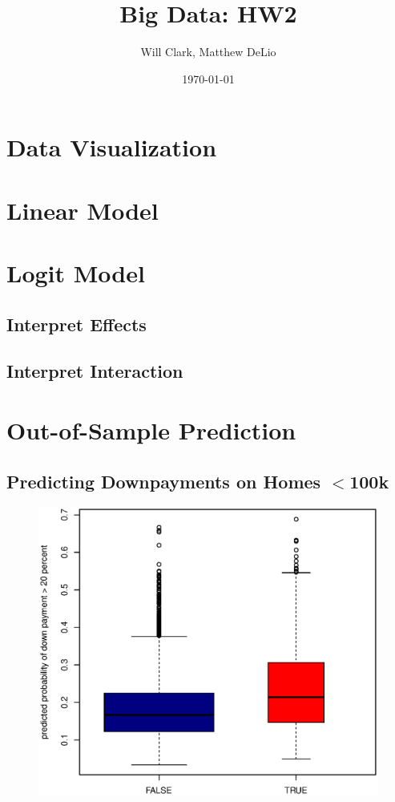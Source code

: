 \documentclass[11pt, fleqn]{article}
\begin{document}
\title{Big Data: HW2}
\author{Will Clark, Matthew DeLio}
\date{\today}
\maketitle

\section{Data Visualization}


\section{Linear Model}


\section{Logit Model}

\subsection{Interpret Effects}


\subsection{Interpret Interaction}


\section{Out-of-Sample Prediction}
\subsection{Predicting Downpayments on Homes $<$100k}
\begin{figure}[!htb]
  \centering
  \includegraphics[scale=.5]{oos_lt100k.eps}
  \caption{}
  \label{fig:oos_lt100k}
\end{figure}
\end{document}
